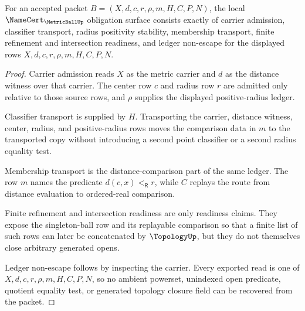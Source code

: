 \begin{theorem}
\label{thm:metric-ball-namecert-obligations}
For an accepted packet $B=(X,d,c,r,\rho,m,H,C,P,N)$, the local $\NameCert_{\MetricBallUp}$ obligation surface consists exactly of carrier admission, classifier transport, radius positivity stability, membership transport, finite refinement and intersection readiness, and ledger non-escape for the displayed rows $X,d,c,r,\rho,m,H,C,P,N$.
\end{theorem}
\begin{proof}
Carrier admission reads $X$ as the metric carrier and $d$ as the distance witness over that carrier. The center row $c$ and radius row $r$ are admitted only relative to those source rows, and $\rho$ supplies the displayed positive-radius ledger.

Classifier transport is supplied by $H$. Transporting the carrier, distance witness, center, radius, and positive-radius rows moves the comparison data in $m$ to the transported copy without introducing a second point classifier or a second radius equality test.

Membership transport is the distance-comparison part of the same ledger. The row $m$ names the predicate $d(c,x)<_{\mathsf R}r$, while $C$ replays the route from distance evaluation to ordered-real comparison.

Finite refinement and intersection readiness are only readiness claims. They expose the singleton-ball row and its replayable comparison so that a finite list of such rows can later be concatenated by $\TopologyUp$, but they do not themselves close arbitrary generated opens.

Ledger non-escape follows by inspecting the carrier. Every exported read is one of $X,d,c,r,\rho,m,H,C,P,N$, so no ambient powerset, unindexed open predicate, quotient equality test, or generated topology closure field can be recovered from the packet.
\end{proof}

